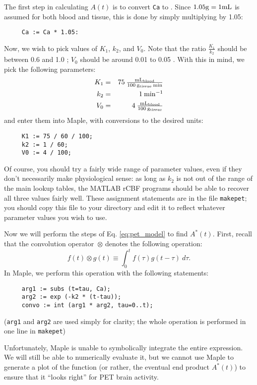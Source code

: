 The first step in calculating $A(t)$ is to convert \verb|Ca| to 
.  Since $1.05 \mbox{$\rm{g}$} = 1
\mbox{$\rm{mL}$}$ is assumed for both blood and tissue, this is done by
simply multiplying by 1.05:
\begin{verbatim}
     Ca := Ca * 1.05:
\end{verbatim}
Now, we wish to pick values of $K_{1}$, $k_{2}$, and $V_{0}$.  Note
that the ratio $\frac{K_{1}}{k_{2}}$ should be between 0.6
and 1.0 ; $V_{0}$ should be around 0.01 to
0.05 .  With this in mind, we pick the
following parameters:
\begin{eqnarray*}
K_{1} &=& 75 \: \mbox{$\rm\frac{mL_{blood}}{100\:g_{tissue}\:{min}}$} \\
k_{2} &=& 1 \: \mbox{$\rm{min^{-1}}$} \\
V_{0} &=& 4 \: \mbox{$\rm\frac{mL_{blood}}{100\:g_{tissue}}$}
\end{eqnarray*}
and enter them into Maple, with conversions to the desired units:
\begin{verbatim}
     K1 := 75 / 60 / 100;
     k2 := 1 / 60;
     V0 := 4 / 100;
\end{verbatim}
Of course, you should try a fairly wide range of parameter values,
even if they don't necessarily make physiological sense: as long as
$k_{2}$ is not out of the range of the main lookup tables, the MATLAB
rCBF programs should be able to recover all three values fairly well.
These assignment statements are in the file \verb|makepet|; you should
copy this file to your directory and edit it to reflect whatever
parameter values you wish to use.

Now we will perform the steps of Eq. \ref{eq:pet_model} to find
$A^{*}(t)$.  First, recall that the convolution operator~$\otimes$
denotes the following operation:
\begin{equation}
f(t) \otimes g(t) \equiv \int_{0}^{t} f(\tau) g(t-\tau) \: d\tau.
\label{eq:convolution} 
\end{equation}
In Maple, we perform this operation with the following statements:
\begin{verbatim}
     arg1 := subs (t=tau, Ca);
     arg2 := exp (-k2 * (t-tau));
     convo := int (arg1 * arg2, tau=0..t);
\end{verbatim}
(\verb|arg1| and \verb|arg2| are used simply for clarity; the whole
operation is performed in one line in \verb|makepet|)

Unfortunately, Maple is unable to symbolically integrate the entire
expression.  We will still be able to numerically evaluate it, but we
cannot use Maple to generate a plot of the function (or rather, the
eventual end product $A^{*}(t)$) to ensure that it ``looks right'' for PET
brain activity.

